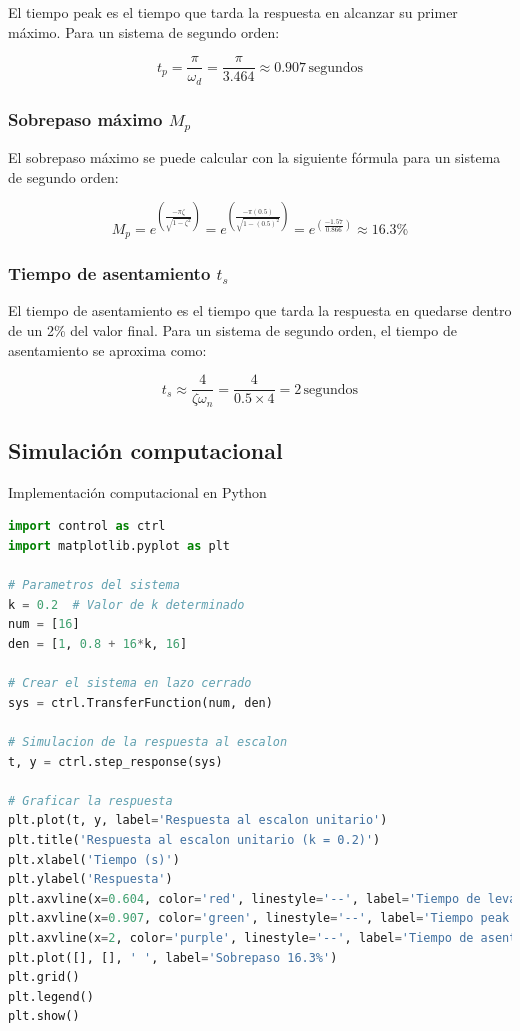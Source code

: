 \documentclass[10pt]{article}
\theoremstyle{definition}
\theoremstyle{remark}
\theoremstyle{definition}
\numberwithin{equation}{prob}
\begin{document}
El tiempo peak es el tiempo que tarda la respuesta en alcanzar su primer máximo. Para un sistema de segundo orden:

\[
	t_p = \frac{\pi}{\omega_d} = \frac{\pi}{3.464} \approx 0.907 \, \text{segundos}
\]

\subsubsection{Sobrepaso máximo \texorpdfstring{\(M_p\)}{Mp}}

El sobrepaso máximo se puede calcular con la siguiente fórmula para un sistema de segundo orden:

\[
	M_p = e^{\left(\frac{-\pi \zeta}{\sqrt{1 - \zeta^2}}\right)} = e^{\left(\frac{-\pi (0.5)}{\sqrt{1 - (0.5)^2}}\right)} = e^{\left(\frac{-1.57}{0.866}\right)} \approx 16.3\%
\]

\subsubsection{Tiempo de asentamiento \texorpdfstring{\(t_s\)}{ts}}

El tiempo de asentamiento es el tiempo que tarda la respuesta en quedarse dentro de un 2\% del valor final. Para un sistema de segundo orden, el tiempo de asentamiento se aproxima como:

\[
	t_s \approx \frac{4}{\zeta \omega_n} = \frac{4}{0.5 \times 4} = 2 \, \text{segundos}
\]

\subsection{Simulación computacional}

Implementación computacional en Python
\begin{lstlisting}[language=Python]
import control as ctrl
import matplotlib.pyplot as plt

# Parametros del sistema
k = 0.2  # Valor de k determinado
num = [16]
den = [1, 0.8 + 16*k, 16]

# Crear el sistema en lazo cerrado
sys = ctrl.TransferFunction(num, den)

# Simulacion de la respuesta al escalon
t, y = ctrl.step_response(sys)

# Graficar la respuesta
plt.plot(t, y, label='Respuesta al escalon unitario')
plt.title('Respuesta al escalon unitario (k = 0.2)')
plt.xlabel('Tiempo (s)')
plt.ylabel('Respuesta')
plt.axvline(x=0.604, color='red', linestyle='--', label='Tiempo de levantamiento (Tr) 0.604 [s]')
plt.axvline(x=0.907, color='green', linestyle='--', label='Tiempo peak (Tp) 0.907 [s]')
plt.axvline(x=2, color='purple', linestyle='--', label='Tiempo de asentamiento (Ts) 2 [s]')
plt.plot([], [], ' ', label='Sobrepaso 16.3%')
plt.grid()
plt.legend() 
plt.show()
\end{lstlisting}
\end{document}
